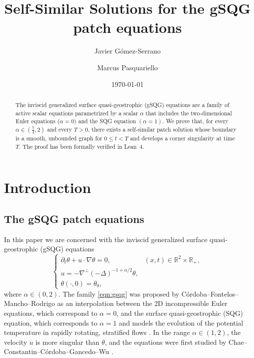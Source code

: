 \documentclass[11pt]{amsart}
\date{\today}
\title{Self-Similar Solutions for the gSQG patch equations}
\author{Javier G\'omez-Serrano}
\author{Marcus Pasquariello}
\theoremstyle{definition}
\theoremstyle{remark}
\numberwithin{equation}{section}
\newcommand{\R}{\mathbb{R}}
\begin{document}
\begin{abstract}
    The inviscid generalized surface quasi-geostrophic (gSQG) equations are a family of active scalar equations parametrized by a scalar $\alpha$ that includes the two-dimensional Euler equations ($\alpha = 0)$ and the SQG equation $(\alpha = 1)$. 
    We prove that, for every $\alpha \in (\frac{7}{4}, 2)$ and every $T > 0$, there exists a self-similar patch solution %
    whose boundary is a smooth, unbounded graph for $0 \leq t < T$ and develops a corner singularity at time $T$.      The proof has been formally verified in Lean~4.
\end{abstract}

\maketitle

\tableofcontents

\section{Introduction}\label{sec:intro}

\subsection{The gSQG patch equations}

In this paper we are concerned with the inviscid generalized surface quasi-geostrophic (gSQG) equations
\begin{equation}\label{eqn:gsqg}
\begin{cases}
    \partial_t \theta + u \cdot \nabla \theta = 0, & (x, t) \in \R^2 \times \R_+, \\
    u = -\nabla^\perp(-\Delta)^{-1+\alpha / 2}\theta, \\
    \theta(\cdot, 0) = \theta_0,
\end{cases}
\end{equation}
where $\alpha \in (0,2)$. The family \eqref{eqn:gsqg} was proposed by C\'ordoba--Fontelos--Mancho--Rodrigo \cite{Cordoba-Fontelos-Mancho-Rodrigo:evidence-singularities-contour-dynamics} as an interpolation between the 2D incompressible Euler equations, which correspond to $\alpha = 0$, and the surface quasi-geostrophic (SQG) equation, which corresponds to $\alpha = 1$ and models the evolution of the potential temperature in rapidly rotating, stratified flows \cite{Constantin-Majda-Tabak:formation-fronts-qg,Held-Pierrehumbert-Garner-Swanson:sqg-dynamics}. In the range $\alpha \in (1,2)$, the velocity $u$ is more singular than $\theta$, and the equations were first studied by Chae--Constantin--C\'ordoba--Gancedo--Wu \cite{Chae-Constantin-Cordoba-Gancedo-Wu:gsqg-singular-velocities}.
\end{document}

